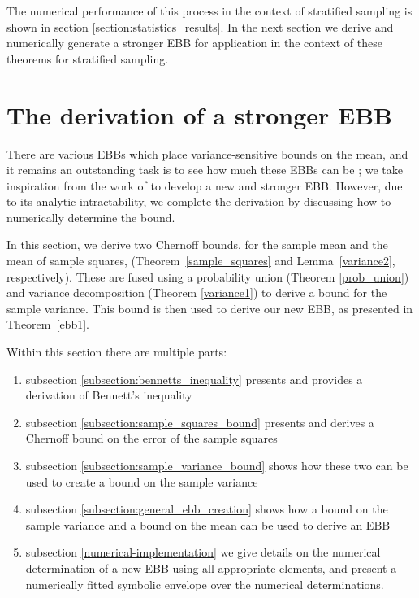 The numerical performance of this process in the context of stratified sampling is shown in section \ref{section:statistics_results}.
In the next section we derive and numerically generate a stronger EBB for application in the context of these theorems for stratified sampling.








\newpage
\section{The derivation of a stronger EBB}\label{section:new_EBB}\label{derivation}

There are various EBBs which place variance-sensitive bounds on the mean, and it remains an outstanding task is to see how much these EBBs can be \DIFdelbegin {}\DIFdelend \DIFaddbegin {}\DIFaddend ; we take inspiration from the work of \cite{Maurer50empiricalbernstein} to develop a new and stronger EBB.
However, due to its analytic intractability, we complete the derivation by discussing how to numerically determine the bound.


In this section, we derive two Chernoff bounds, for the sample mean and the mean of sample squares, (Theorem~\ref{sample_squares} and Lemma~\ref{variance2}, respectively). 
These are fused using a probability union (Theorem \ref{prob_union}) and variance decomposition (Theorem \ref{variance1}) to derive a bound for the sample variance. This bound is then used to derive our new EBB, as presented in Theorem~\ref{ebb1}.

Within this section there are multiple parts:
\begin{enumerate}
\item	subsection \ref{subsection:bennetts_inequality} presents and provides a derivation of Bennett's inequality
\item	subsection \ref{subsection:sample_squares_bound} presents and derives a Chernoff bound on the error of the sample squares
\item	subsection \ref{subsection:sample_variance_bound} shows how these two can be used to create a bound on the sample variance
\item	subsection \ref{subsection:general_ebb_creation} shows how a bound on the sample variance and a bound on the mean can be used to derive an EBB
\item	subsection \ref{numerical-implementation} we give details on the numerical determination of a new EBB using all appropriate elements, and present a numerically fitted symbolic envelope over the numerical determinations. 
\end{enumerate}


